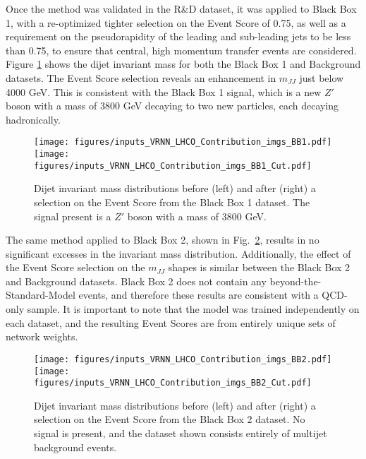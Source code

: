 \documentclass[a4paper,11pt]{article}
\begin{document}
Once the method was validated in the R\&D dataset, it was applied to Black Box 1, with a re-optimized tighter selection on the Event Score of 0.75, as well as a requirement on the pseudorapidity of the leading and sub-leading jets to be less than 0.75, to ensure that central, high momentum transfer events are considered. Figure {\ref{fig:bb1}} shows the dijet invariant mass for both the Black Box 1 and Background datasets. The Event Score selection reveals an enhancement in $m_{JJ}$ just below 4000 GeV. This is consistent with the Black Box 1 signal, which is a new $Z'$ boson with a mass of 3800 GeV decaying to two new particles, each decaying hadronically.

\begin{figure}[h!]
	\begin{center}
		\texttt{[image: figures/inputs\_VRNN\_LHCO\_Contribution\_imgs\_BB1.pdf]}
		\texttt{[image: figures/inputs\_VRNN\_LHCO\_Contribution\_imgs\_BB1\_Cut.pdf]}
	\end{center}
	\caption{Dijet invariant mass distributions before (left) and after (right) a selection on the Event Score from the Black Box 1 dataset. The signal present is a $Z'$ boson with a mass of 3800 GeV.}
	\label{fig:bb1}
\end{figure}

The same method applied to Black Box 2, shown in Fig.~\ref{fig:bb2}, results in no significant excesses in the invariant mass distribution. Additionally, the effect of the Event Score selection on the $m_{JJ}$ shapes is similar between the Black Box 2 and Background datasets. Black Box 2 does not contain any beyond-the-Standard-Model events, and therefore these results are consistent with a QCD-only sample. It is important to note that the model was trained independently on each dataset, and the resulting Event Scores are from entirely unique sets of network weights.

\begin{figure}[h!]
	\begin{center}
		\texttt{[image: figures/inputs\_VRNN\_LHCO\_Contribution\_imgs\_BB2.pdf]}
		\texttt{[image: figures/inputs\_VRNN\_LHCO\_Contribution\_imgs\_BB2\_Cut.pdf]}
	\end{center}
	\caption{Dijet invariant mass distributions before (left) and after (right) a selection on the Event Score from the Black Box 2 dataset. No signal is present, and the dataset shown consists entirely of multijet background events.}
	\label{fig:bb2}
\end{figure}
\end{document}
